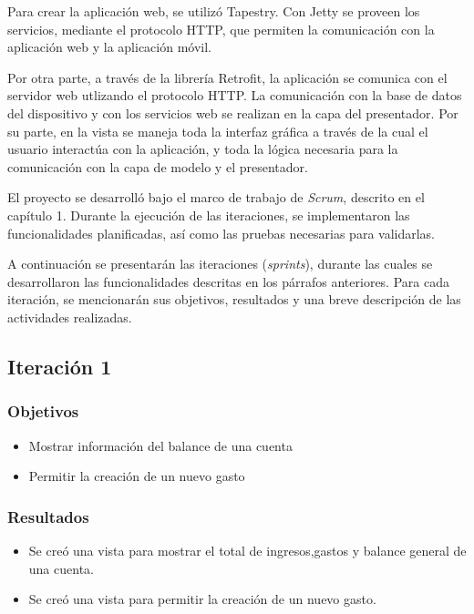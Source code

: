 Para crear la aplicación web, se utilizó Tapestry. Con Jetty se proveen los servicios, mediante el protocolo HTTP, que permiten la comunicación con la aplicación web y la aplicación  móvil.

Por otra parte, a través de la librería Retrofit, la aplicación se comunica con el servidor web utlizando el protocolo HTTP. La comunicación con la base de datos del dispositivo y con los servicios web se realizan en la capa del presentador. Por su parte, en la vista se maneja toda la interfaz gráfica a través de la cual el usuario interactúa con la aplicación, y toda la lógica necesaria para la comunicación con la capa de modelo y el presentador.

El proyecto se desarrolló bajo el marco de trabajo de \textit{Scrum}, descrito en el capítulo 1. Durante la ejecución de las iteraciones, se implementaron las funcionalidades planificadas, así como las pruebas necesarias para validarlas.

A continuación se presentarán las iteraciones (\textit{sprints}), durante las cuales se desarrollaron las funcionalidades descritas en los párrafos anteriores. Para cada iteración, se mencionarán sus objetivos, resultados y una breve descripción de las actividades realizadas.

\subsection{Iteración 1}

\subsubsection{Objetivos}
	\begin{itemize}
	\item Mostrar información del balance de una cuenta
	\item Permitir la creación de un nuevo gasto
	\end{itemize}

\subsubsection{Resultados}
\begin{itemize}
\item Se creó una vista para mostrar el total de ingresos,gastos y balance general de una cuenta.
\item Se creó una vista para permitir la creación de un nuevo gasto.
\end{itemize}


